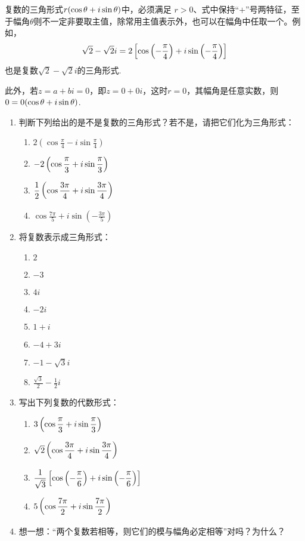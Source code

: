 \begin{rmk}
复数的三角形式$r(\cos{\theta}+i\sin{\theta})$中，必须满足
    $r>0$、式中保持“$+$”号两特征，至于幅角$\theta$则不一定非要取主值，除常用主值表示外，也可以在幅角中任取一个。例如，
\[\sqrt{2}-\sqrt{2}i=2\left[\cos\left(-\dfrac{\pi}{4}\right)+i\sin\left(-\dfrac{\pi}{4}\right)\right]\]
也是复数$\sqrt{2}-\sqrt{2}i$的三角形式.

此外，若$z=a+bi=0$，即$z=0+0i$，这时$r=0$，其幅角是任意实数，则$0=0(\cos{\theta}+i\sin{\theta})$.
\end{rmk}

\begin{ex}
\begin{enumerate}
    \item 判断下列给出的是不是复数的三角形式？若不是，请把它们化为三角形式：
\begin{multicols}{2}
    \begin{enumerate}[(1)]
        \item $2\left(\cos\frac{\pi}{4}-i\sin\frac{\pi}{4}\right)$
        \item $-2\left(\cos{\dfrac{\pi}{3}}+i\sin{\dfrac{\pi}{3}}\right)$
        \item $\dfrac{1}{2}\left(\cos{\dfrac{3\pi}{4}}+i\sin{\dfrac{3\pi}{4}}\right)$
        \item $\cos\frac{7\pi}{5}+i\sin\left(-\frac{3\pi}{5}\right)$
    \end{enumerate}
\end{multicols}
    \item 将复数表示成三角形式：
\begin{multicols}{3}
    \begin{enumerate}[(1)]
        \item $2$
        \item $-3$
        \item $4i$
        \item $-2i$
        \item $1+i$
        \item $-4+3i$
        \item $-1-\sqrt{3}i$
        \item $\frac{\sqrt{3}}{2}-\frac{1}{2}i$
    \end{enumerate}
\end{multicols}
\item    写出下列复数的代数形式：
\begin{multicols}{2}
    \begin{enumerate}[(1)]
        \item $3\left(\cos{\dfrac{\pi}{3}}+i\sin{\dfrac{\pi}{3}}\right)$
        \item $\sqrt{2}\left(\cos{\dfrac{3\pi}{4}}+i\sin{\dfrac{3\pi}{4}}\right)$
        \item $\dfrac{1}{\sqrt{3}}\left[\cos\left(-\dfrac{\pi}{6}\right)+i\sin\left(-\dfrac{\pi}{6}\right)\right]$
        \item $5\left(\cos{\dfrac{7\pi}{2}}+i\sin{\dfrac{7\pi}{2}}\right)$
    \end{enumerate}
\end{multicols}

\item 想一想：“两个复数若相等，则它们的模与幅角必定相等”对吗？为什么？
\end{enumerate}
\end{ex}

